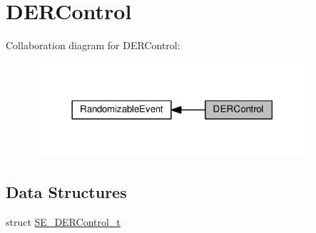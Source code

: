 \hypertarget{group__DERControl}{}\section{D\+E\+R\+Control}
\label{group__DERControl}
Collaboration diagram for D\+E\+R\+Control\+:\nopagebreak
\begin{figure}[H]
\begin{center}
\leavevmode
\includegraphics[width=290pt]{group__DERControl}
\end{center}
\end{figure}
\subsection*{Data Structures}
\begin{DoxyCompactItemize}
\item 
struct \hyperlink{structSE__DERControl__t}{S\+E\+\_\+\+D\+E\+R\+Control\+\_\+t}
\end{DoxyCompactItemize}
